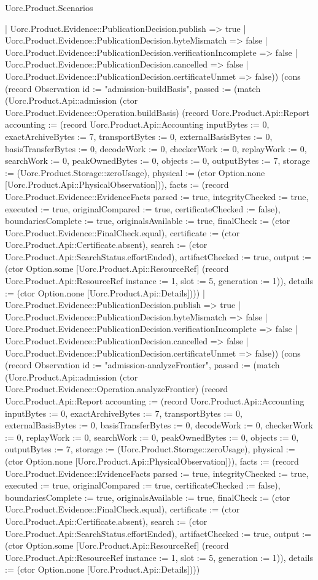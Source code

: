 \begin{lexlean}{Uorc.Product.Scenarios}
\begin{semanticmodule}
{{    | Uorc.Product.Evidence::PublicationDecision.publish => true
    | Uorc.Product.Evidence::PublicationDecision.byteMismatch => false
    | Uorc.Product.Evidence::PublicationDecision.verificationIncomplete => false
    | Uorc.Product.Evidence::PublicationDecision.cancelled => false
    | Uorc.Product.Evidence::PublicationDecision.certificateUnmet => false)}) (cons (record Observation {id := "admission-buildBasis", passed := (match (Uorc.Product.Api::admission (ctor Uorc.Product.Evidence::Operation.buildBasis) (record Uorc.Product.Api::Report {accounting := (record Uorc.Product.Api::Accounting {inputBytes := 0, exactArchiveBytes := 7, transportBytes := 0, externalBasisBytes := 0, basisTransferBytes := 0, decodeWork := 0, checkerWork := 0, replayWork := 0, searchWork := 0, peakOwnedBytes := 0, objects := 0, outputBytes := 7, storage := (Uorc.Product.Storage::zeroUsage), physical := (ctor Option.none [Uorc.Product.Api::PhysicalObservation])}), facts := (record Uorc.Product.Evidence::EvidenceFacts {parsed := true, integrityChecked := true, executed := true, originalCompared := true, certificateChecked := false}), boundariesComplete := true, originalsAvailable := true, finalCheck := (ctor Uorc.Product.Evidence::FinalCheck.equal), certificate := (ctor Uorc.Product.Api::Certificate.absent), search := (ctor Uorc.Product.Api::SearchStatus.effortEnded), artifactChecked := true, output := (ctor Option.some [Uorc.Product.Api::ResourceRef] (record Uorc.Product.Api::ResourceRef {instance := 1, slot := 5, generation := 1})), details := (ctor Option.none [Uorc.Product.Api::Details])}))
    | Uorc.Product.Evidence::PublicationDecision.publish => true
    | Uorc.Product.Evidence::PublicationDecision.byteMismatch => false
    | Uorc.Product.Evidence::PublicationDecision.verificationIncomplete => false
    | Uorc.Product.Evidence::PublicationDecision.cancelled => false
    | Uorc.Product.Evidence::PublicationDecision.certificateUnmet => false)}) (cons (record Observation {id := "admission-analyzeFrontier", passed := (match (Uorc.Product.Api::admission (ctor Uorc.Product.Evidence::Operation.analyzeFrontier) (record Uorc.Product.Api::Report {accounting := (record Uorc.Product.Api::Accounting {inputBytes := 0, exactArchiveBytes := 7, transportBytes := 0, externalBasisBytes := 0, basisTransferBytes := 0, decodeWork := 0, checkerWork := 0, replayWork := 0, searchWork := 0, peakOwnedBytes := 0, objects := 0, outputBytes := 7, storage := (Uorc.Product.Storage::zeroUsage), physical := (ctor Option.none [Uorc.Product.Api::PhysicalObservation])}), facts := (record Uorc.Product.Evidence::EvidenceFacts {parsed := true, integrityChecked := true, executed := true, originalCompared := true, certificateChecked := false}), boundariesComplete := true, originalsAvailable := true, finalCheck := (ctor Uorc.Product.Evidence::FinalCheck.equal), certificate := (ctor Uorc.Product.Api::Certificate.absent), search := (ctor Uorc.Product.Api::SearchStatus.effortEnded), artifactChecked := true, output := (ctor Option.some [Uorc.Product.Api::ResourceRef] (record Uorc.Product.Api::ResourceRef {instance := 1, slot := 5, generation := 1})), details := (ctor Option.none [Uorc.Product.Api::Details])}))
}}
\end{semanticmodule}
\end{lexlean}
